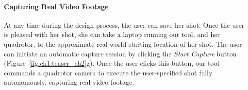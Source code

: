 \paragraph{Capturing Real Video Footage}

At any time during the design process, the user can save her shot.
Once the user is pleased with her shot, she can take a laptop running our tool, and her quadrotor, to the approximate real-world starting location of her shot.
The user can initiate an automatic capture session by clicking the \emph{Start Capture} button (Figure~\ref{fig:ch1:teaser_ch2}g).
Once the user clicks this button, our tool commands a quadrotor camera to execute the user-specified shot fully autonomously, capturing real video footage.
